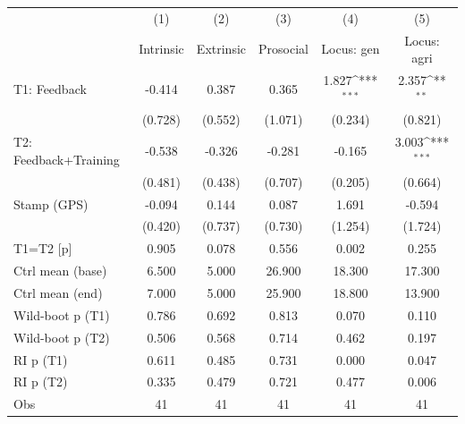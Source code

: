 {
\def\sym#1{\ifmmode^{#1}\else\(^{#1}\)\fi}
\begin{tabular}{l*{5}{c}}
\toprule
                    &\multicolumn{1}{c}{(1)}&\multicolumn{1}{c}{(2)}&\multicolumn{1}{c}{(3)}&\multicolumn{1}{c}{(4)}&\multicolumn{1}{c}{(5)}\\
                    &\multicolumn{1}{c}{Intrinsic}&\multicolumn{1}{c}{Extrinsic}&\multicolumn{1}{c}{Prosocial}&\multicolumn{1}{c}{Locus: gen}&\multicolumn{1}{c}{Locus: agri}\\
\midrule
T1: Feedback        &      -0.414         &       0.387         &       0.365         &       1.827\sym{***}&       2.357\sym{**} \\
                    &     (0.728)         &     (0.552)         &     (1.071)         &     (0.234)         &     (0.821)         \\
T2: Feedback+Training&      -0.538         &      -0.326         &      -0.281         &      -0.165         &       3.003\sym{***}\\
                    &     (0.481)         &     (0.438)         &     (0.707)         &     (0.205)         &     (0.664)         \\
Stamp (GPS)         &      -0.094         &       0.144         &       0.087         &       1.691         &      -0.594         \\
                    &     (0.420)         &     (0.737)         &     (0.730)         &     (1.254)         &     (1.724)         \\
\midrule
T1=T2 [p]           &       0.905         &       0.078         &       0.556         &       0.002         &       0.255         \\
Ctrl mean (base)    &       6.500         &       5.000         &      26.900         &      18.300         &      17.300         \\
Ctrl mean (end)     &       7.000         &       5.000         &      25.900         &      18.800         &      13.900         \\
Wild-boot p (T1)    &       0.786         &       0.692         &       0.813         &       0.070         &       0.110         \\
Wild-boot p (T2)    &       0.506         &       0.568         &       0.714         &       0.462         &       0.197         \\
RI p (T1)           &       0.611         &       0.485         &       0.731         &       0.000         &       0.047         \\
RI p (T2)           &       0.335         &       0.479         &       0.721         &       0.477         &       0.006         \\
Obs                 &          41         &          41         &          41         &          41         &          41         \\
\bottomrule
\end{tabular}
}

